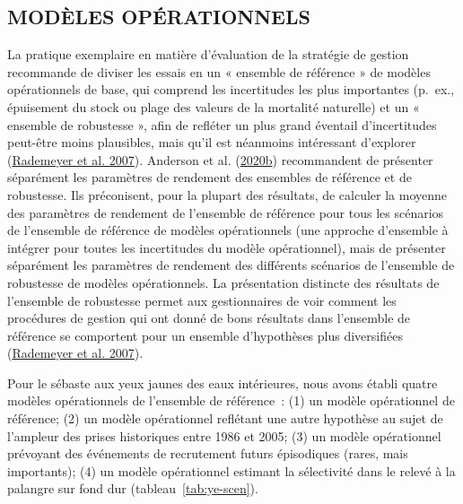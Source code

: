 \documentclass[french,11pt]{book}
\begin{document}
\hypertarget{sec:approach3-oms}{%
\subsection{MODÈLES OPÉRATIONNELS}\label{sec:approach3-oms}}

La pratique exemplaire en matière d'évaluation de la stratégie de gestion recommande de diviser les essais en un « ensemble de référence » de modèles opérationnels de base, qui comprend les incertitudes les plus importantes (p.~ex., épuisement du stock ou plage des valeurs de la mortalité naturelle) et un « ensemble de robustesse », afin de refléter un plus grand éventail d'incertitudes peut-être moins plausibles, mais qu'il est néanmoins intéressant d'explorer (\protect\hyperlink{ref-rademeyer2007}{Rademeyer et al. 2007}). Anderson et al. (\protect\hyperlink{ref-anderson2020gfmp}{2020b}) recommandent de présenter séparément les paramètres de rendement des ensembles de référence et de robustesse. Ils préconisent, pour la plupart des résultats, de calculer la moyenne des paramètres de rendement de l'ensemble de référence pour tous les scénarios de l'ensemble de référence de modèles opérationnels (une approche d'ensemble à intégrer pour toutes les incertitudes du modèle opérationnel), mais de présenter séparément les paramètres de rendement des différents scénarios de l'ensemble de robustesse de modèles opérationnels. La présentation distincte des résultats de l'ensemble de robustesse permet aux gestionnaires de voir comment les procédures de gestion qui ont donné de bons résultats dans l'ensemble de référence se comportent pour un ensemble d'hypothèses plus diversifiées (\protect\hyperlink{ref-rademeyer2007}{Rademeyer et al. 2007}).

Pour le sébaste aux yeux jaunes des eaux intérieures, nous avons établi quatre modèles opérationnels de l'ensemble de référence~: (1) un modèle opérationnel de référence; (2) un modèle opérationnel reflétant une autre hypothèse au sujet de l'ampleur des prises historiques entre 1986 et 2005; (3) un modèle opérationnel prévoyant des événements de recrutement futurs épisodiques (rares, mais importants); (4) un modèle opérationnel estimant la sélectivité dans le relevé à la palangre sur fond dur (tableau~\ref{tab:ye-scen}).
\end{document}
